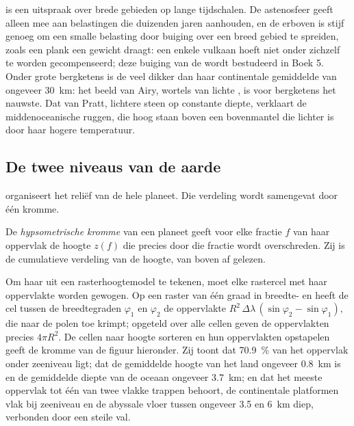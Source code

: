  is een uitspraak over brede gebieden op lange tijdschalen. De astenosfeer geeft alleen mee aan belastingen die duizenden jaren aanhouden, en de  erboven is stijf genoeg om een smalle belasting door buiging over een breed gebied te spreiden, zoals een plank een gewicht draagt: een enkele vulkaan hoeft niet onder zichzelf te worden gecompenseerd; deze buiging van de  wordt bestudeerd in Boek 5. Onder grote bergketens is de  veel dikker dan haar continentale gemiddelde van ongeveer \qty{30}{km}: het beeld van Airy, wortels van lichte , is voor bergketens het nauwste. Dat van Pratt, lichtere steen op constante diepte, verklaart de middenoceanische ruggen, die hoog staan boven een bovenmantel die lichter is door haar hogere temperatuur.

\subsection*{De twee niveaus van de aarde}

 organiseert het reliëf van de hele planeet. Die verdeling wordt samengevat door één kromme.

\begin{definition}\label{def:b1:isostasy-gravity:hypsometry}
De \emph{hypsometrische kromme} van een planeet geeft voor elke fractie $f$ van haar oppervlak de hoogte $z(f)$ die precies door die fractie wordt overschreden. Zij is de cumulatieve verdeling van de hoogte, van boven af gelezen.
\end{definition}

Om haar uit een rasterhoogtemodel te tekenen, moet elke rastercel met haar oppervlakte worden gewogen. Op een raster van één graad in breedte- en  heeft de cel tussen de breedtegraden $\varphi_1$ en $\varphi_2$ de oppervlakte $R^2\,\Delta\lambda\,(\sin\varphi_2 - \sin\varphi_1)$, die naar de polen toe krimpt; opgeteld over alle cellen geven de oppervlakten precies $4\pi R^2$. De cellen naar hoogte sorteren en hun oppervlakten opstapelen geeft de kromme van de figuur hieronder. Zij toont dat \qty{70.9}{\percent} van het oppervlak onder zeeniveau ligt; dat de gemiddelde hoogte van het land ongeveer \qty{0.8}{km} is en de gemiddelde diepte van de oceaan ongeveer \qty{3.7}{km}; en dat het meeste oppervlak tot één van twee vlakke trappen behoort, de continentale platformen vlak bij zeeniveau en de abyssale vloer tussen ongeveer 3.5 en \qty{6}{km} diep, verbonden door een steile val.

